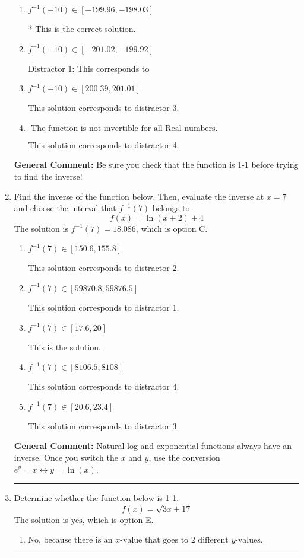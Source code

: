 \documentclass{extbook}[14pt]
\newcommand{\litem}[1]{\item #1

\rule{\textwidth}{0.4pt}}
\begin{document}
\begin{enumerate}
{\begin{enumerate}[label=\Alph*.]
 This solution corresponds to distractor 2.
\item \( f^{-1}(-10) \in [-199.96, -198.03] \)

* This is the correct solution.
\item \( f^{-1}(-10) \in [-201.02, -199.92] \)

 Distractor 1: This corresponds to 
\item \( f^{-1}(-10) \in [200.39, 201.01] \)

 This solution corresponds to distractor 3.
\item \( \text{ The function is not invertible for all Real numbers. } \)

 This solution corresponds to distractor 4.
\end{enumerate}

\textbf{General Comment:} Be sure you check that the function is 1-1 before trying to find the inverse!
}
\litem{
Find the inverse of the function below. Then, evaluate the inverse at $x = 7$ and choose the interval that $f^{-1}(7)$ belongs to.
\[ f(x) = \ln{(x+2)}+4 \]The solution is \( f^{-1}(7) = 18.086 \), which is option C.\begin{enumerate}[label=\Alph*.]
\item \( f^{-1}(7) \in [150.6, 155.8] \)

 This solution corresponds to distractor 2.
\item \( f^{-1}(7) \in [59870.8, 59876.5] \)

 This solution corresponds to distractor 1.
\item \( f^{-1}(7) \in [17.6, 20] \)

 This is the solution.
\item \( f^{-1}(7) \in [8106.5, 8108] \)

 This solution corresponds to distractor 4.
\item \( f^{-1}(7) \in [20.6, 23.4] \)

 This solution corresponds to distractor 3.
\end{enumerate}

\textbf{General Comment:} Natural log and exponential functions always have an inverse. Once you switch the $x$ and $y$, use the conversion $ e^y = x \leftrightarrow y=\ln(x)$.
}
\litem{
Determine whether the function below is 1-1.
\[ f(x) = \sqrt{3 x + 17} \]The solution is \( \text{yes} \), which is option E.\begin{enumerate}[label=\Alph*.]
\item \( \text{No, because there is an $x$-value that goes to 2 different $y$-values.} \)


\end{enumerate}}
\end{enumerate}
\end{document}
